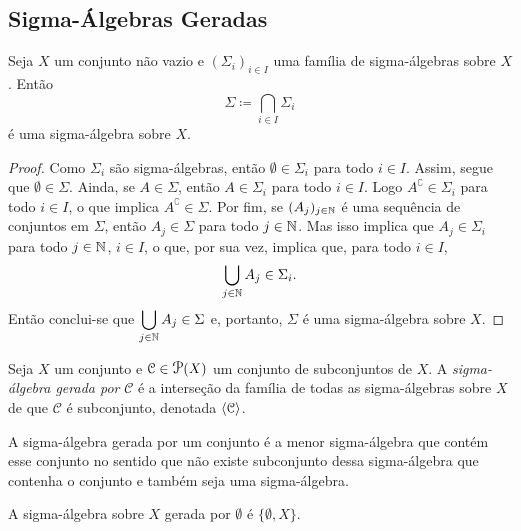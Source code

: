\subsection{Sigma-Álgebras Geradas}

\begin{prop}
Seja $X$ um conjunto não vazio e $(\Sigma_i)_{i \in I}$ uma família de sigma-álgebras sobre $X$. Então
	\begin{equation*}
	\Sigma \coloneqq \bigcap_{i \in I} \Sigma_i
	\end{equation*}
é uma sigma-álgebra sobre $X$.
\end{prop}
\begin{proof}
	Como $\Sigma_i$ são sigma-álgebras, então $\emptyset \in \Sigma_i$ para todo $i \in I$. Assim, segue que $\emptyset \in \Sigma$. Ainda, se $A \in \Sigma$, então $A \in \Sigma_i$ para todo $i \in I$. Logo $A^\complement \in \Sigma_i$ para todo $i \in I$, o que implica $A^\complement \in \Sigma$. Por fim, se $(A_j)_{j \in \mathbb{N}}$ é uma sequência de conjuntos em $\Sigma$, então $A_j \in \Sigma$ para todo $j \in \mathbb{N}$. Mas isso implica que $A_j \in \Sigma_i$ para todo $j \in \mathbb{N}$, $i \in I$, o que, por sua vez, implica que, para todo $i \in I$,
	\begin{equation*}
	\bigcup_{j \in \mathbb{N}} A_j \in \Sigma_i.
	\end{equation*}
Então conclui-se que $\displaystyle\bigcup_{j \in \mathbb{N}} A_j \in \Sigma$ e, portanto, $\Sigma$ é uma sigma-álgebra sobre $X$.
\end{proof}

\begin{defi}
Seja $X$ um conjunto e $\mathcal C \in \p(X)$ um conjunto de subconjuntos de $X$. A \emph{sigma-álgebra gerada por} $\mathcal C$ é a interseção da família de todas as sigma-álgebras sobre $X$ de que $\mathcal C$ é subconjunto, denotada $\left\langle \mathcal C \right\rangle$.
\end{defi}
	
	A sigma-álgebra gerada por um conjunto é a menor sigma-álgebra que contém esse conjunto no sentido que não existe subconjunto dessa sigma-álgebra que contenha o conjunto e também seja uma sigma-álgebra.

\begin{ex}
	A sigma-álgebra sobre $X$ gerada por $\emptyset$ é $\{\emptyset, X\}$.
\end{ex}


